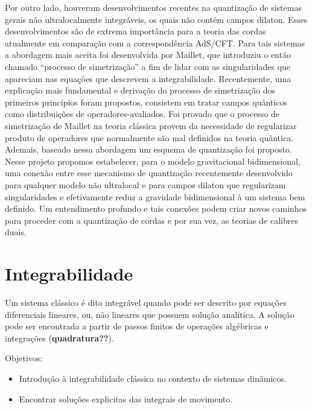 \documentclass[25pt]{article}
\numberwithin{equation}{subsection} %
\begin{document}
Por outro lado, houveram desenvolvimentos recentes na quantização de sistemas gerais não ultralocalmente integráveis, os quais não contém campos dilaton. Esses desenvolvimentos são de extrema importância para a teoria das cordas atualmente em comparação com a correspondência AdS/CFT. Para tais sistemas a abordagem mais aceita foi desenvolvida por Maillet, que introduziu o então chamado “processo de simetrização” a fim de lidar com as singularidades que apareciam nas equações que descrevem a integrabilidade. Recentemente, uma explicação mais fundamental e derivação do processo de simetrização dos primeiros princípios foram propostos, consistem em tratar campos quânticos como distribuições de operadores-avaliados. Foi provado que o processo de simetrização de Maillet na teoria clássica provem da necessidade de regularizar produto de operadores que normalmente são mal definidos na teoria quântica. Ademais, baseado nessa abordagem um esquema de quantização foi proposto.
Nesse projeto propomos estabelecer, para o modelo gravitacional bidimensional, uma conexão entre esse mecanismo de quantização recentemente desenvolvido para qualquer modelo não ultralocal e para campos dilaton que regularizam singularidades e efetivamente reduz a gravidade bidimensional à um sistema bem definido. Um entendimento profundo e tais conexões podem criar novos caminhos para proceder com a quantização de cordas e por sua vez, as teorias de calibres duais.

\pagebreak 

\section{Integrabilidade}
Um sistema clássico é dito integrável quando pode ser descrito por equações diferenciais lineares, ou, não lineares que possuem solução analítica. A solução pode ser encontrada a partir de passos finitos de operações algébricas e integrações (\textbf{quadratura??}). \begin{flushleft}
	{\large Objetivos: }\begin{itemize}
		\item Introdução à integrabilidade clássica no contexto de sistemas dinâmicos.
		\item Encontrar soluções explicitas das integrais de movimento.
	\end{itemize}
\end{flushleft}
\end{document}
